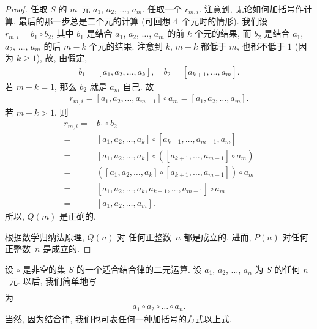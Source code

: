 \begin{proof}
    任取 \(S\) 的 \(m\)~元
    \(a_1\), \(a_2\), \(\dots\), \(a_m\).
    任取一个 \(r_{m,i}\).
    注意到, 无论如何加括号作计算,
    最后的那一步总是二个元的计算
    (可回想 \(4\)~个元时的情形).
    我们设 \(r_{m,i} = b_1 \circ b_2\),
    其中 \(b_1\) 是结合 \(a_1\), \(a_2\), \(\dots\), \(a_m\)
    的前 \(k\) 个元的结果,
    而 \(b_2\) 是结合 \(a_1\), \(a_2\), \(\dots\), \(a_m\)
    的后 \(m-k\) 个元的结果.
    注意到 \(k\), \(m-k\) 都低于 \(m\),
    也都不低于 \(1\)
    (因为 \(k \geq 1\)),
    故, 由假定,
    \begin{align*}
        b_1 = [a_1, a_2, \dots, a_k],
        \quad
        b_2 = [a_{k+1}, \dots, a_m].
    \end{align*}
    若 \(m - k = 1\), 那么 \(b_2\) 就是 \(a_m\) 自己.
    故
    \begin{align*}
        r_{m,i}
            = [a_1, a_2, \dots, a_{m-1}] \circ a_m
        = [a_1, a_2, \dots, a_m].
    \end{align*}
    若 \(m - k > 1\), 则
    \begin{align*}
        r_{m,i}
        = {} &
        b_1 \circ b_2
        \\
        = {} &
        [a_1, a_2, \dots, a_k] \circ
        [a_{k+1}, \dots, a_{m-1}, a_m]
        \\
        = {} &
        [a_1, a_2, \dots, a_k] \circ
        ([a_{k+1}, \dots, a_{m-1}] \circ a_m)
        \\
        = {} &
        ([a_1, a_2, \dots, a_k] \circ
        [a_{k+1}, \dots, a_{m-1}]) \circ a_m
        \\
        = {} &
        [a_1, a_2, \dots, a_k, a_{k+1}, \dots, a_{m-1}]
        \circ a_m
        \\
        = {} &
        [a_1, a_2, \dots, a_m].
    \end{align*}
    所以, \(Q(m)\) 是正确的.

    根据数学归纳法原理, \(Q(n)\) 对%
    任何正整数~\(n\) 都是成立的.
    进而, \(P(n)\) 对任何正整数~\(n\) 是成立的.
\end{proof}

设 \(\circ\) 是非空的集 \(S\) 的一个适合结合律的二元运算.
设 \(a_1\), \(a_2\), \(\dots\), \(a_n\) 为 \(S\) 的任何 \(n\)~元.
以后, 我们简单地写
\begin{align*}
    [a_1, a_2, \dots, a_n]
\end{align*}
为
\begin{align*}
    a_1 \circ a_2 \circ \dots \circ a_n.
\end{align*}
当然, 因为结合律, 我们也可表任何一种加括号的方式以上式.


